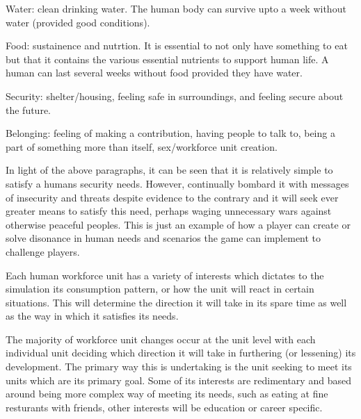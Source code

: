 Water: clean drinking water. The human body can survive upto a week without water (provided good conditions). 

Food: sustainence and nutrtion. It is essential to not only have something to eat but that it contains the various essential nutrients to support human life. A human can last several weeks without food provided they have water.

Security: shelter/housing, feeling safe in surroundings, and feeling secure about the future.

Belonging: feeling of making a contribution, having people to talk to, being a part of something more than itself, sex/workforce unit creation.



In light of the above paragraphs, it can be seen that it is relatively simple to satisfy a humans security needs. However, continually bombard it with messages of insecurity and threats despite evidence to the contrary and it will seek ever greater means to satisfy this need, perhaps waging unnecessary wars against otherwise peaceful peoples. This is just an example of how a player can create or solve disonance in human needs and scenarios the game can implement to challenge players.










Each human workforce unit has a variety of interests which dictates to the simulation its consumption pattern, or how the unit will react in certain situations. This will determine the direction it will take in its spare time as well as the way in which it satisfies its needs. 

The majority of workforce unit changes occur at the unit level with each individual unit deciding which direction it will take in furthering (or lessening) its development. The primary way this is undertaking is the unit seeking to meet its units which are its primary goal. Some of its interests are redimentary and based around being more complex way of meeting its needs, such as eating at fine resturants with friends, other interests will be education or career specific. 

